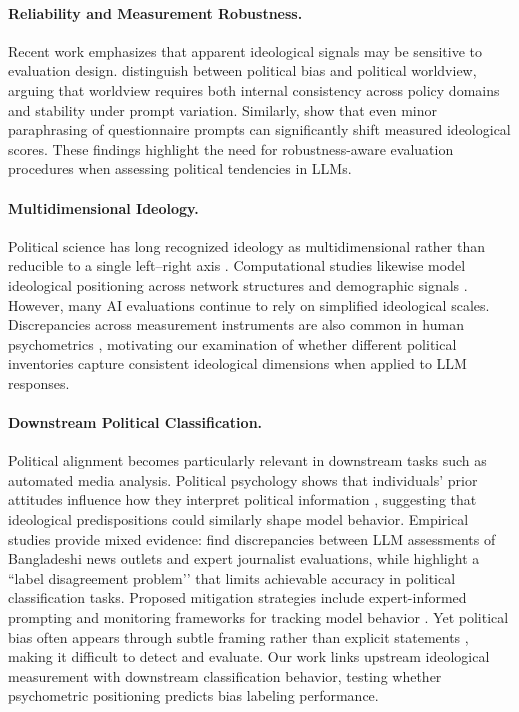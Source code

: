 \documentclass[11pt]{article}
\begin{document}
\paragraph{Reliability and Measurement Robustness.}
Recent work emphasizes that apparent ideological signals may be sensitive to evaluation design. \citet{ceron-etal-2024-beyond} distinguish between political bias and political worldview, arguing that worldview requires both internal consistency across policy domains and stability under prompt variation. Similarly, \citet{rottger-etal-2024-political} show that even minor paraphrasing of questionnaire prompts can significantly shift measured ideological scores. These findings highlight the need for robustness-aware evaluation procedures when assessing political tendencies in LLMs.

\paragraph{Multidimensional Ideology.}
Political science has long recognized ideology as multidimensional rather than reducible to a single left--right axis \cite{sinno-etal-2022-political}. Computational studies likewise model ideological positioning across network structures and demographic signals \cite{PhysRevResearch.6.013170, ojer_charting_2025}. However, many AI evaluations continue to rely on simplified ideological scales. Discrepancies across measurement instruments are also common in human psychometrics \cite{bagaini_systematic_2025}, motivating our examination of whether different political inventories capture consistent ideological dimensions when applied to LLM responses.

\paragraph{Downstream Political Classification.}
Political alignment becomes particularly relevant in downstream tasks such as automated media analysis. Political psychology shows that individuals’ prior attitudes influence how they interpret political information \cite{wilson2014perceptions,kunda1990motivated,ditto2019partisan}, suggesting that ideological predispositions could similarly shape model behavior. Empirical studies provide mixed evidence: \citet{prama-islam-2025-evaluating} find discrepancies between LLM assessments of Bangladeshi news outlets and expert journalist evaluations, while \citet{Rnnback2025} highlight a “label disagreement problem’’ that limits achievable accuracy in political classification tasks. Proposed mitigation strategies include expert-informed prompting \cite{mujahid-etal-2025-profiling} and monitoring frameworks for tracking model behavior \cite{Wang2025}. Yet political bias often appears through subtle framing rather than explicit statements \cite{Raza2022}, making it difficult to detect and evaluate. Our work links upstream ideological measurement with downstream classification behavior, testing whether psychometric positioning predicts bias labeling performance.
\end{document}
